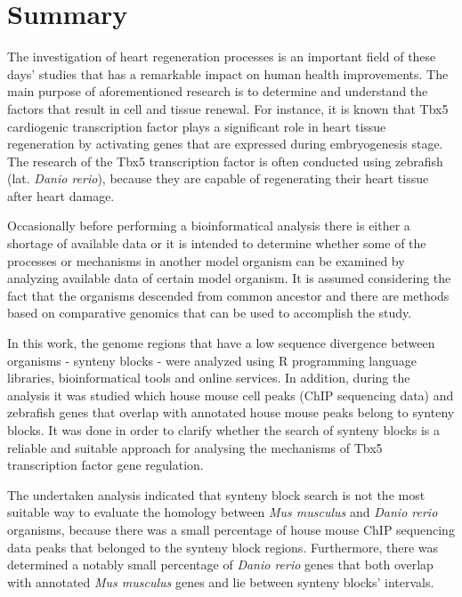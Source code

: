 \documentclass[12pt]{article}
\begin{document}
\newpage


\section*{Summary}
The investigation of heart regeneration processes is an important field of
these days' studies that has a remarkable impact on human health improvements.
The main purpose of aforementioned research is to determine and understand the
factors that result in cell and tissue renewal. For instance, it is known that
Tbx5 cardiogenic transcription factor plays a significant role in heart tissue
regeneration by activating genes that are expressed during embryogenesis stage.
The research of the Tbx5 transcription factor is often conducted using 
zebrafish (lat. \emph{Danio rerio}), because they are capable of regenerating
their heart tissue after heart damage.

Occasionally before performing a bioinformatical analysis there is either
a shortage of available data or it is intended to determine whether some of the
processes or mechanisms in another model organism can be examined by analyzing
available data of certain model organism. It is assumed considering the fact
that the organisms descended from common ancestor and there are methods based
on comparative genomics that can be used to accomplish the study.

In this work, the genome regions that have a low sequence divergence between
organisms - synteny blocks - were analyzed using R programming language
libraries, bioinformatical tools and online services. In addition, during the
analysis it was studied which house mouse cell peaks (ChIP sequencing data) and
zebrafish genes that overlap with annotated house mouse peaks belong to synteny
blocks. It was done in order to clarify whether the search of synteny blocks is
a reliable and suitable approach for analysing the mechanisms of Tbx5
transcription factor gene regulation.

The undertaken analysis indicated that synteny block search is not the most
suitable way to evaluate the homology between \emph{Mus musculus} and
\emph{Danio rerio} organisms, because there was a small percentage of house
mouse ChIP sequencing data peaks that belonged to the synteny block regions.
Furthermore, there was determined a notably small percentage of
\emph{Danio rerio} genes that both overlap with annotated \emph{Mus musculus}
genes and lie between synteny blocks' intervals.
\end{document}

